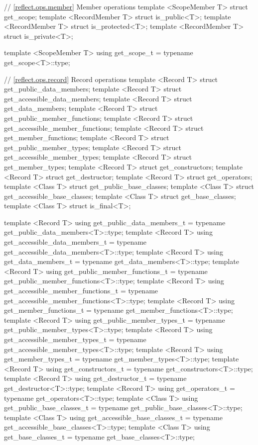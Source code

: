 \begin{std.txt}
\begin{codeblock}
{{// \ref{reflect.ops.member} Member operations
template <ScopeMember T> struct get_scope;
template <RecordMember T> struct is_public<T>;
template <RecordMember T> struct is_protected<T>;
template <RecordMember T> struct is_private<T>;

template <ScopeMember T>
  using get_scope_t = typename get_scope<T>::type;

// \ref{reflect.ops.record} Record operations
template <Record T> struct get_public_data_members;
template <Record T> struct get_accessible_data_members;
template <Record T> struct get_data_members;
template <Record T> struct get_public_member_functions;
template <Record T> struct get_accessible_member_functions;
template <Record T> struct get_member_functions;
template <Record T> struct get_public_member_types;
template <Record T> struct get_accessible_member_types;
template <Record T> struct get_member_types;
template <Record T> struct get_constructors;
template <Record T> struct get_destructor;
template <Record T> struct get_operators;
template <Class T> struct get_public_base_classes;
template <Class T> struct get_accessible_base_classes;
template <Class T> struct get_base_classes;
template <Class T> struct is_final<T>;

template <Record T>
  using get_public_data_members_t = typename get_public_data_members<T>::type;
template <Record T>
  using get_accessible_data_members_t = typename get_accessible_data_members<T>::type;
template <Record T>
  using get_data_members_t = typename get_data_members<T>::type;
template <Record T>
  using get_public_member_functions_t = typename get_public_member_functions<T>::type;
template <Record T>
  using get_accessible_member_functions_t = typename get_accessible_member_functions<T>::type;
template <Record T>
  using get_member_functions_t = typename get_member_functions<T>::type;
template <Record T>
  using get_public_member_types_t = typename get_public_member_types<T>::type;
template <Record T>
  using get_accessible_member_types_t = typename get_accessible_member_types<T>::type;
template <Record T>
  using get_member_types_t = typename get_member_types<T>::type;
template <Record T>
  using get_constructors_t = typename get_constructors<T>::type;
template <Record T>
  using get_destructor_t = typename get_destructor<T>::type;
template <Record T>
  using get_operators_t = typename get_operators<T>::type;
template <Class T>
  using get_public_base_classes_t = typename get_public_base_classes<T>::type;
template <Class T>
  using get_accessible_base_classes_t = typename get_accessible_base_classes<T>::type;
template <Class T>
  using get_base_classes_t = typename get_base_classes<T>::type;

}}
\end{codeblock}
\end{std.txt}
